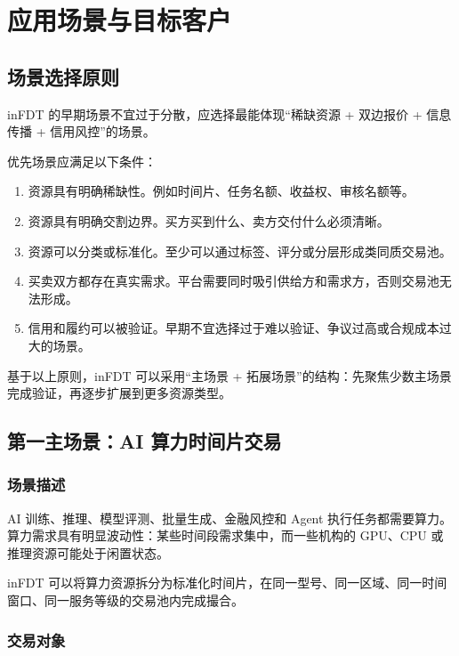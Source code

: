 \documentclass[UTF8,a4paper,12pt]{ctexart}
\begin{document}
\newpage
\section{应用场景与目标客户}

\subsection{场景选择原则}

inFDT 的早期场景不宜过于分散，应选择最能体现“稀缺资源 + 双边报价 + 信息传播 + 信用风控”的场景。

优先场景应满足以下条件：

\begin{enumerate}
    \item 资源具有明确稀缺性。例如时间片、任务名额、收益权、审核名额等。
    \item 资源具有明确交割边界。买方买到什么、卖方交付什么必须清晰。
    \item 资源可以分类或标准化。至少可以通过标签、评分或分层形成类同质交易池。
    \item 买卖双方都存在真实需求。平台需要同时吸引供给方和需求方，否则交易池无法形成。
    \item 信用和履约可以被验证。早期不宜选择过于难以验证、争议过高或合规成本过大的场景。
\end{enumerate}

基于以上原则，inFDT 可以采用“主场景 + 拓展场景”的结构：先聚焦少数主场景完成验证，再逐步扩展到更多资源类型。

\subsection{第一主场景：AI 算力时间片交易}

\subsubsection*{场景描述}

AI 训练、推理、模型评测、批量生成、金融风控和 Agent 执行任务都需要算力。算力需求具有明显波动性：某些时间段需求集中，而一些机构的 GPU、CPU 或推理资源可能处于闲置状态。

inFDT 可以将算力资源拆分为标准化时间片，在同一型号、同一区域、同一时间窗口、同一服务等级的交易池内完成撮合。

\subsubsection*{交易对象}
\end{document}
